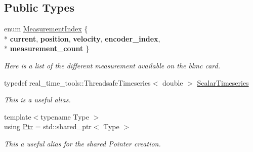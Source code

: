 \subsection*{Public Types}
\begin{DoxyCompactItemize}
\item 
enum \hyperlink{classblmc__drivers_1_1MotorInterface_a35c1217dd295078c67bacc2cba08ab33}{Measurement\+Index} \{ \\*
{\bfseries current}, 
{\bfseries position}, 
{\bfseries velocity}, 
{\bfseries encoder\+\_\+index}, 
\\*
{\bfseries measurement\+\_\+count}
 \}\hypertarget{classblmc__drivers_1_1MotorInterface_a35c1217dd295078c67bacc2cba08ab33}{}\label{classblmc__drivers_1_1MotorInterface_a35c1217dd295078c67bacc2cba08ab33}
\begin{DoxyCompactList}\small\item\em Here is a list of the different measurement available on the blmc card. \end{DoxyCompactList}
\item 
typedef real\+\_\+time\+\_\+tools\+::\+Threadsafe\+Timeseries$<$ double $>$ \hyperlink{classblmc__drivers_1_1MotorInterface_a49b8fc916b9f9debbd7b0988463db5cd}{Scalar\+Timeseries}\hypertarget{classblmc__drivers_1_1MotorInterface_a49b8fc916b9f9debbd7b0988463db5cd}{}\label{classblmc__drivers_1_1MotorInterface_a49b8fc916b9f9debbd7b0988463db5cd}

\begin{DoxyCompactList}\small\item\em This is a useful alias. \end{DoxyCompactList}\item 
{\footnotesize template$<$typename Type $>$ }\\using \hyperlink{classblmc__drivers_1_1MotorInterface_ae31f230b9da3674a05543023c90b124c}{Ptr} = std\+::shared\+\_\+ptr$<$ Type $>$
\begin{DoxyCompactList}\small\item\em This a useful alias for the shared Pointer creation. \end{DoxyCompactList}\end{DoxyCompactItemize}
